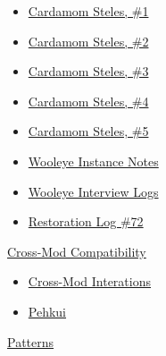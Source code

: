 \documentclass[12pt]{article}
\begin{document}
    \begin{itemize}
        \item\hyperref[ sec:lore/cardamom1 ]{ Cardamom Steles, \#1}
        \item\hyperref[ sec:lore/cardamom2 ]{ Cardamom Steles, \#2}
        \item\hyperref[ sec:lore/cardamom3 ]{ Cardamom Steles, \#3}
        \item\hyperref[ sec:lore/cardamom4 ]{ Cardamom Steles, \#4}
        \item\hyperref[ sec:lore/cardamom5 ]{ Cardamom Steles, \#5}
        \item\hyperref[ sec:lore/experiment1 ]{ Wooleye Instance Notes}
        \item\hyperref[ sec:lore/experiment2 ]{ Wooleye Interview Logs}
        \item\hyperref[ sec:lore/inventory ]{ Restoration Log \#72}
    \end{itemize}
    \hyperref[ sec:interop ]{ Cross-Mod Compatibility}

    \begin{itemize}
        \item\hyperref[ sec:interop/interop ]{ Cross-Mod Interations}
        \item\hyperref[ sec:interop/pehkui ]{ Pehkui}
    \end{itemize}
    \hyperref[ sec:patterns ]{ Patterns}
\end{document}
